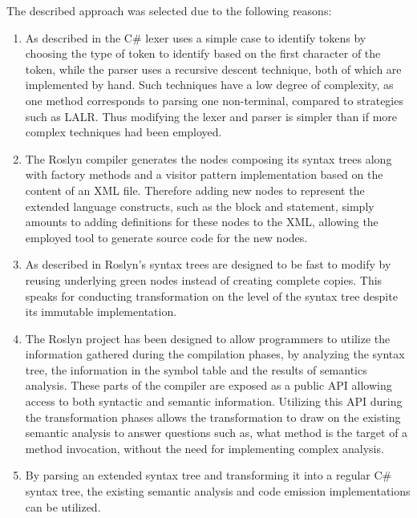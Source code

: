 The described approach was selected due to the following reasons:
\begin{enumerate}
\item As described in  the C\# lexer uses a simple  case to identify tokens by choosing the type of token to identify based on the first character of the token, while the parser uses a recursive descent technique, both of which are implemented by hand. Such techniques have a low degree of complexity, as one method corresponds to parsing one non-terminal, compared to strategies such as \ac{LALR}\cite{nunes2003cps}. Thus modifying the lexer and parser is simpler than if more complex techniques had been employed.

\item The Roslyn compiler generates the nodes composing its syntax trees along with factory methods and a visitor pattern implementation based on the content of an \ac{XML} file. Therefore adding new nodes to represent the extended language constructs, such as the  block and  statement, simply amounts to adding definitions for these nodes to the \ac{XML}, allowing the employed tool to generate source code for the new nodes. 

\item As described in  Roslyn's syntax trees are designed to be fast to modify by reusing underlying green nodes instead of creating complete copies\cite[p. 6]{ng2012roslyn}. This speaks for conducting transformation on the level of the syntax tree despite its immutable implementation.

\item The Roslyn project has been designed to allow programmers to utilize the information gathered during the compilation phases, by analyzing the syntax tree, the information in the symbol table and the results of semantics analysis. These parts of the compiler are exposed as a public \ac{API} allowing access to both syntactic and semantic information. Utilizing this \ac{API} during the transformation phases allows the transformation to draw on the existing semantic analysis to answer questions such as, what method is the target of a method invocation, without the need for implementing complex analysis.

\item By parsing an extended syntax tree and transforming it into a regular C\# syntax tree, the existing semantic analysis and code emission implementations can be utilized.
\end{enumerate}

